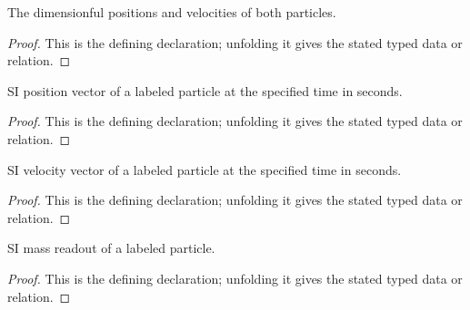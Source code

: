 \begin{definition}[PairMotion]
  \label{decl:physics:IPhO_2026_1_B_2:PairMotion}
  The dimensionful positions and velocities of both particles.
\end{definition}
\begin{proof}
  This is the defining declaration; unfolding it gives the stated typed data or relation.
\end{proof}

\begin{definition}[positionSI]
  \label{decl:physics:IPhO_2026_1_B_2:positionSI}
  SI position vector of a labeled particle at the specified time in seconds.
\end{definition}
\begin{proof}
  This is the defining declaration; unfolding it gives the stated typed data or relation.
\end{proof}

\begin{definition}[velocitySI]
  \label{decl:physics:IPhO_2026_1_B_2:velocitySI}
  SI velocity vector of a labeled particle at the specified time in seconds.
\end{definition}
\begin{proof}
  This is the defining declaration; unfolding it gives the stated typed data or relation.
\end{proof}

\begin{definition}[particleMassSI]
  \label{decl:physics:IPhO_2026_1_B_2:particleMassSI}
  SI mass readout of a labeled particle.
\end{definition}
\begin{proof}
  This is the defining declaration; unfolding it gives the stated typed data or relation.
\end{proof}

